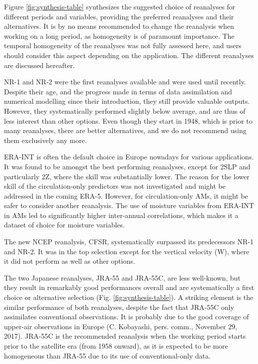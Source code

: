 \documentclass{ametsoc}
\begin{document}
	Figure \ref{fig:synthesis-table} synthesizes the suggested choice of reanalyses for different periods and variables, providing the preferred reanalyses and their alternatives. It is by no means recommended to change the reanalysis when working on a long period, as homogeneity is of paramount importance. The temporal homogeneity of the reanalyses was not fully assessed here, and users should consider this aspect depending on the application. The different reanalyses are discussed hereafter.
	
	NR-1 and NR-2 were the first reanalyses available and were used until recently. Despite their age, and the progress made in terms of data assimilation and numerical modelling since their introduction, they still provide valuable outputs. However, they systematically performed slightly below average, and are thus of less interest than other options. Even though they start in 1948, which is prior to many reanalyses, there are better alternatives, and we do not recommend using them exclusively any more.
	
	ERA-INT is often the default choice in Europe nowadays for various applications. It was found to be amongst the best performing reanalyses, except for 2SLP and particularly 2Z, where the skill was substantially lower. The reason for the lower skill of the circulation-only predictors was not investigated and might be addressed in the coming ERA-5. However, for circulation-only AMs, it might be safer to consider another reanalysis. The use of moisture variables from ERA-INT in AMs led to significantly higher inter-annual correlations, which makes it a dataset of choice for moisture variables.
	
	The new NCEP reanalysis, CFSR, systematically surpassed its predecessors NR-1 and NR-2. It was in the top selection except for the vertical velocity (W), where it did not perform as well as other options.
	
	The two Japanese reanalyses, JRA-55 and JRA-55C, are less well-known, but they result in remarkably good performances overall and are systematically a first choice or alternative selection (Fig. \ref{fig:synthesis-table}). A striking element is the similar performance of both reanalyses, despite the fact that JRA-55C only assimilates conventional observations. It is probably due to the good coverage of upper-air observations in Europe (C. Kobayashi, pers. comm., November 29, 2017). JRA-55C is the recommended reanalysis when the working period starts prior to the satellite era (from 1958 onward), as it is expected to be more homogeneous than JRA-55 due to its use of conventional-only data.
	
\end{document}
